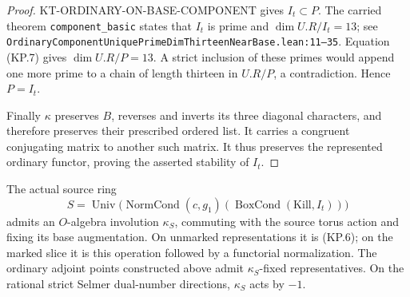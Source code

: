 \begin{proof}
KT-ORDINARY-ON-BASE-COMPONENT gives $I_t\subset P$.  The carried
theorem \texttt{component\_basic} states that $I_t$ is prime and
$\dim U.R/I_t=13$; see
\texttt{OrdinaryComponentUniquePrimeDimThirteenNearBase.lean:11--35}.
Equation (KP.7) gives $\dim U.R/P=13$.  A strict inclusion of
these primes would append one more prime to a chain of length
thirteen in $U.R/P$, a contradiction.  Hence $P=I_t$.

Finally $\kappa$ preserves $B$, reverses and inverts its three
diagonal characters, and therefore preserves their prescribed
ordered list.  It carries a congruent conjugating matrix to
another such matrix.  It thus preserves the represented
ordinary functor, proving the asserted stability of $I_t$.
\end{proof}

\begin{lemma}
The actual source ring
\[
 S=\operatorname{Univ}\bigl(\operatorname{NormCond}(c,g_1)
                        (\operatorname{BoxCond}(\mathrm{Kill},I_t))\bigr)
\]
admits an $O$-algebra involution $\kappa_S$, commuting with the
source torus action and fixing its base augmentation.  On
unmarked representations it is (KP.6); on the marked slice it
is this operation followed by a functorial normalization.
The ordinary adjoint points constructed above admit
$\kappa_S$-fixed representatives.  On the rational strict
Selmer dual-number directions, $\kappa_S$ acts by $-1$.
\end{lemma}
